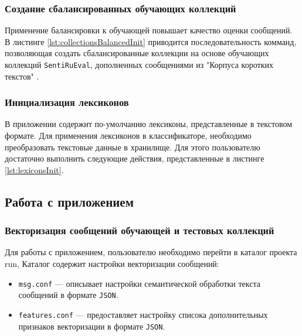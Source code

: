         \subsubsection{Создание сбалансированных обучающих коллекций}
        Применение балансировки к обучающей повышает качество оценки сообщений.
        \cite{diploma2015} В листинге \ref{lst:collectionsBalancedInit} приводится
        последовательность комманд, позволяющая создать сбалансированные коллекции
        на основе обучающих коллекций {\tt SentiRuEval}, дополненных сообщениями
        из "Корпуса коротких текстов" \cite{rubtsovaCollection}.
        \lstset{style=bash}
        

        \subsubsection{Инициализация лексиконов}
        В приложении содержит по-умолчанию лексиконы, представленные в текстовом
        формате. Для применения лексиконов в классификаторе, необходимо преобразовать
        текстовые данные в хранилище. Для этого пользователю
        достаточно выполнить следующие действия, представленные в листинге
        \ref{lst:lexiconsInit}.
        \lstset{style=bash}
        

    \subsection{Работа с приложением}
        \subsubsection{Векторизация сообщений обучающей и тестовых коллекций}
        \label{sec:usage_vectorize}
        Для работы с приложением, пользователю необходимо перейти в каталог проекта {run},
        Каталог содержит настройки векторизации сообщений:
        \begin{itemize}
            \item {\tt msg.conf} --- описывает настройки семантической обработки текста
                сообщений в формате {\tt JSON}.
            \item {\tt features.conf} --- предоставляет настройку списока
                дополнительных признаков векторизации в формате {\tt JSON}.
        \end{itemize}


